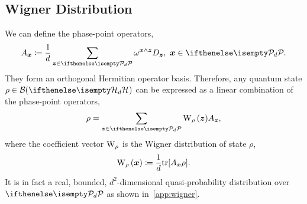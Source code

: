 \documentclass[pra,
aps,
twocolumn,
superscriptaddress,
groupedaddress,
nofootinbib,
reprint
]{revtex4-1}
\begin{document}
\subsection{Wigner Distribution}\label{sec:wigner}

We can define the phase-point operators,
\begin{align}
	A_{\bmx} \coloneqq \frac{1}{d} \sum_{\bmz \in \pd} \omega^{\bmx \wedge \bmz} D_{\bmz},\ \bmx \in \pd. \label{eq:ax}
\end{align}
 They form an orthogonal Hermitian operator basis.
Therefore, any quantum state $\rho \in \cal{B}(\hd)$ can be expressed as a linear combination of the phase-point operators,
\begin{equation}
    \rho = \sum_{\bmz \in \pd} \W[\bmz]{\rho} A_{\bmz},
\end{equation}
where the coefficient vector $\W{\rho}$ is the Wigner distribution of state $\rho$,
\begin{equation}\label{eq:wstate}
    \W[\bmx]{\rho} \coloneqq \frac{1}{d}\tr[A_{\bmx} \rho].
\end{equation}
It is in fact a real, bounded, $d^2$-dimensional quasi-probability distribution over $\pd$ as shown in~\cref{app:wigner}. 
\end{document}
